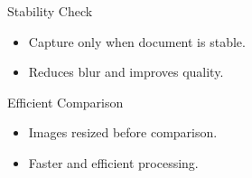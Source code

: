 \documentclass{beamer}
\begin{document}
\begin{frame}{Stability Check}
\begin{itemize}
\item Capture only when document is stable.
\item Reduces blur and improves quality.
\end{itemize}
\end{frame}

\begin{frame}{Efficient Comparison}
\begin{itemize}
\item Images resized before comparison.
\item Faster and efficient processing.
\end{itemize}
\end{frame}


\end{document}
